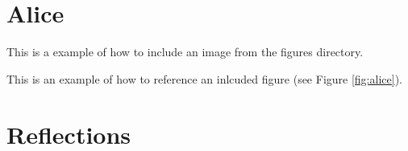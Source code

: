 \documentclass{l3proj}
\begin{document}

\section{Alice}
\label{sec:alice}

This is a example of how to include an image from the figures directory.



This is an example of how to reference an inlcuded figure (see Figure \ref{fig:alice}).

\section{Reflections}
\label{sec:reflections}

\end{document}
